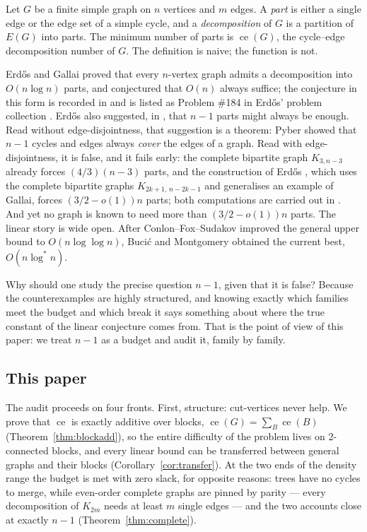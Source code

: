 \documentclass[a4paper,11pt]{amsart}
\theoremstyle{definition}
\theoremstyle{remark}
\newcommand{\ce}{\operatorname{ce}}
\begin{document}
Let $G$ be a finite simple graph on $n$ vertices and $m$ edges. A \emph{part} is either a single edge or
the edge set of a simple cycle, and a \emph{decomposition} of $G$ is a partition of $E(G)$ into parts. The
minimum number of parts is $\ce(G)$, the cycle--edge decomposition number of $G$. The definition is naive;
the function is not.

Erd\H{o}s and Gallai \cite{EG59} proved that every $n$-vertex graph admits a decomposition into
$O(n\log n)$ parts, and conjectured that $O(n)$ always suffice; the conjecture in this form is recorded in
\cite{EGP66} and is listed as Problem \#184 in Erd\H{o}s' problem collection \cite{EP184}. Erd\H{o}s also
suggested, in \cite{Er71}, that $n-1$ parts might always be enough. Read without edge-disjointness, that
suggestion is a theorem: Pyber \cite{Py85} showed that $n-1$ cycles and edges always \emph{cover} the edges
of a graph. Read with edge-disjointness, it is false, and it fails early: the complete bipartite graph
$K_{3,n-3}$ already forces $(4/3)(n-3)$ parts, and the construction of Erd\H{o}s \cite{E83}, which uses the
complete bipartite graphs $K_{2k+1,\,n-2k-1}$ and generalises an example of Gallai, forces
$(3/2-o(1))n$ parts; both computations are carried out in \cite{BM22}. And yet no graph is known to need
more than $(3/2-o(1))n$ parts. The linear story is wide open. After
Conlon--Fox--Sudakov \cite{CFS14} improved the general upper bound to $O(n\log\log n)$, Buci\'c and
Montgomery \cite{BM22} obtained the current best, $O(n\log^* n)$.

Why should one study the precise question $n-1$, given that it is false? Because the counterexamples are
highly structured, and knowing exactly which families meet the budget and which break it says something
about where the true constant of the linear conjecture comes from. That is the point of view of this paper:
we treat $n-1$ as a budget and audit it, family by family.

\subsection{This paper}

The audit proceeds on four fronts. First, structure: cut-vertices never help. We prove that $\ce$ is
exactly additive over blocks,
$\ce(G)=\sum_{B}\ce(B)$ (Theorem~\ref{thm:blockadd}), so the entire difficulty of the problem lives on
$2$-connected blocks, and every linear bound can be transferred between general graphs and their blocks
(Corollary~\ref{cor:transfer}). At the two ends of the density range the budget is met with zero slack, for
opposite reasons: trees have no cycles to merge, while even-order complete graphs are pinned by parity
--- every decomposition of $K_{2m}$ needs at least $m$ single edges --- and the two accounts close at
exactly $n-1$ (Theorem~\ref{thm:complete}).
\end{document}

